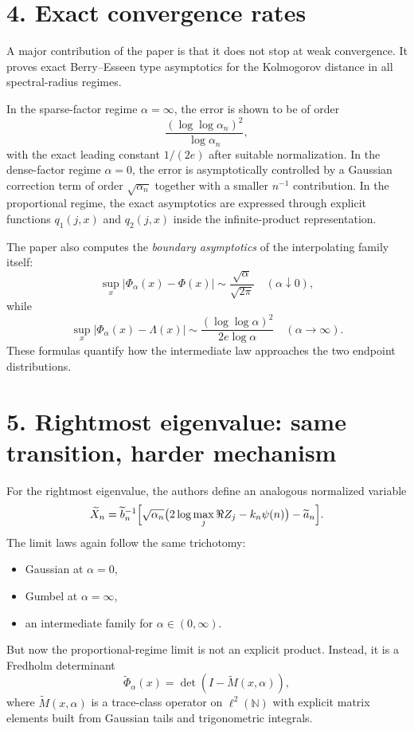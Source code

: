 \documentclass[11pt]{article}
\begin{document}
\section*{4. Exact convergence rates}
A major contribution of the paper is that it does not stop at weak convergence. It proves exact Berry--Esseen type asymptotics for the Kolmogorov distance in all spectral-radius regimes.

In the sparse-factor regime $\alpha=\infty$, the error is shown to be of order
\[
\frac{(\log\log \alpha_n)^2}{\log \alpha_n},
\]
with the exact leading constant $1/(2e)$ after suitable normalization. In the dense-factor regime $\alpha=0$, the error is asymptotically controlled by a Gaussian correction term of order $\sqrt{\alpha_n}$ together with a smaller $n^{-1}$ contribution. In the proportional regime, the exact asymptotics are expressed through explicit functions $q_1(j,x)$ and $q_2(j,x)$ inside the infinite-product representation.

The paper also computes the \emph{boundary asymptotics} of the interpolating family itself:
\[
\sup_x |\Phi_\alpha(x)-\Phi(x)| \sim \frac{\sqrt\alpha}{\sqrt{2\pi}} \quad (\alpha\downarrow 0),
\]
while
\[
\sup_x |\Phi_\alpha(x)-\Lambda(x)| \sim \frac{(\log\log\alpha)^2}{2e\log\alpha} \quad (\alpha\to\infty).
\]
These formulas quantify how the intermediate law approaches the two endpoint distributions.

\section*{5. Rightmost eigenvalue: same transition, harder mechanism}
For the rightmost eigenvalue, the authors define an analogous normalized variable
\[
\widetilde X_n=\widetilde b_n^{-1}\Bigl[\sqrt{\alpha_n}\bigl(2\log\max_j \Re Z_j-k_n\psi(n)\bigr)-\widetilde a_n\Bigr].
\]
The limit laws again follow the same trichotomy:
\begin{itemize}[leftmargin=1.5em]
\item Gaussian at $\alpha=0$,
\item Gumbel at $\alpha=\infty$,
\item an intermediate family for $\alpha\in(0,\infty)$.
\end{itemize}
But now the proportional-regime limit is not an explicit product. Instead, it is a Fredholm determinant
\[
\widetilde\Phi_\alpha(x)=\det(I-\widetilde M(x,\alpha)),
\]
where $\widetilde M(x,\alpha)$ is a trace-class operator on $\ell^2(\mathbb N)$ with explicit matrix elements built from Gaussian tails and trigonometric integrals.
\end{document}
